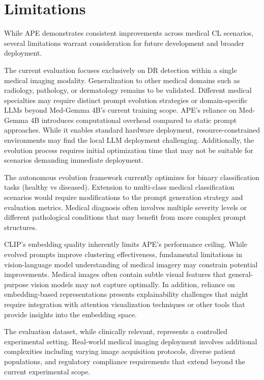 \documentclass[pdflatex,sn-mathphys-num]{sn-jnl}%
\theoremstyle{thmstyleone}%
\theoremstyle{thmstyletwo}%
\theoremstyle{thmstylethree}%
\begin{document}

\section{Limitations}
\label{sec:limitations}

While APE demonstrates consistent improvements across medical CL scenarios, several limitations warrant consideration for future development and broader deployment.

The current evaluation focuses exclusively on DR detection within a single medical imaging modality. Generalization to other medical domains such as radiology, pathology, or dermatology remains to be validated. Different medical specialties may require distinct prompt evolution strategies or domain-specific LLMs beyond Med-Gemma 4B's current training scope. APE's reliance on Med-Gemma 4B introduces computational overhead compared to static prompt approaches. While it enables standard hardware deployment, resource-constrained environments may find the local LLM deployment challenging. Additionally, the evolution process requires initial optimization time that may not be suitable for scenarios demanding immediate deployment. 

The autonomous evolution framework currently optimizes for binary classification tasks (healthy vs diseased). Extension to multi-class medical classification scenarios would require modifications to the prompt generation strategy and evaluation metrics. Medical diagnosis often involves multiple severity levels or different pathological conditions that may benefit from more complex prompt structures. 


CLIP's embedding quality inherently limits APE's performance ceiling. While evolved prompts improve clustering effectiveness, fundamental limitations in vision-language model understanding of medical imagery may constrain potential improvements. Medical images often contain subtle visual features that general-purpose vision models may not capture optimally. In addition, reliance on embedding-based representations presents explainability challenges that might require integration with attention visualization techniques or other tools that provide insights into the embedding space.

The evaluation dataset, while clinically relevant, represents a controlled experimental setting. Real-world medical imaging deployment involves additional complexities including varying image acquisition protocols, diverse patient populations, and regulatory compliance requirements that extend beyond the current experimental scope.
\end{document}
